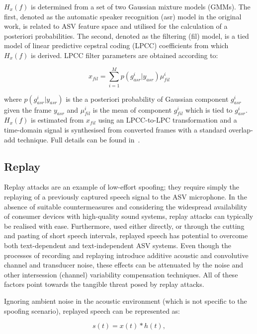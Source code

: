$H_x(f)$ is determined from a set of two Gaussian mixture models (GMMs).  The first, denoted as the automatic speaker recognition (asr) model in the original work, is related to ASV feature space and utilised for the calculation of a posteriori probabilities.  The second, denoted as the filtering (fil) model, is a tied model of linear predictive cepstral coding (LPCC) coefficients from which $H_x(f)$ is derived.  LPCC filter parameters are obtained according to:

\begin{equation}
x_{fil} = \sum\limits_{i=1}^{M}p(g_{asr}^{i}|y_{asr}) \mu_{fil}^{i}
\label{eq:EMit}
\end{equation}

\noindent where $p(g_{asr}^{i}|y_{asr})$ is the a posteriori probability of Gaussian component $g_{asr}^{i}$ given the frame $y_{asr}$ and $\mu_{fil}^{i}$ is the mean of component $g_{fil}^{i}$ which is tied to $g_{asr}^{i}$.  $H_{x}(f)$ is estimated from $x_{fil}$ using an LPCC-to-LPC transformation and a time-domain signal is synthesised from converted frames with a standard overlap-add technique. Full details can be found in~\cite{Matrouf2005, Bonastre2006, Bonastre2007}.


\subsection{Replay}

Replay attacks are an example of low-effort spoofing; they require simply the replaying of a previously captured speech signal to the ASV microphone.  
In the absence of suitable countermeasures and considering the widespread availability of consumer devices with high-quality sound systems, replay attacks can typically be realised with ease.  Furthermore, used either directly, or through the cutting and pasting of short speech intervals, replayed speech has potential to overcome both text-dependent and text-independent ASV systems.  Even though the processes of recording and replaying introduce additive acoustic and convolutive channel and transducer noise, these effects can be attenuated by the noise and other intersession (channel) variability compensation techniques.  All of these factors point towards the tangible threat posed by replay attacks.

Ignoring ambient noise in the acoustic environment (which is not specific to the spoofing scenario), replayed speech can be represented as:


\begin{equation}
s(t) = x(t)*h(t),
\label{eq:replay}
\end{equation}


